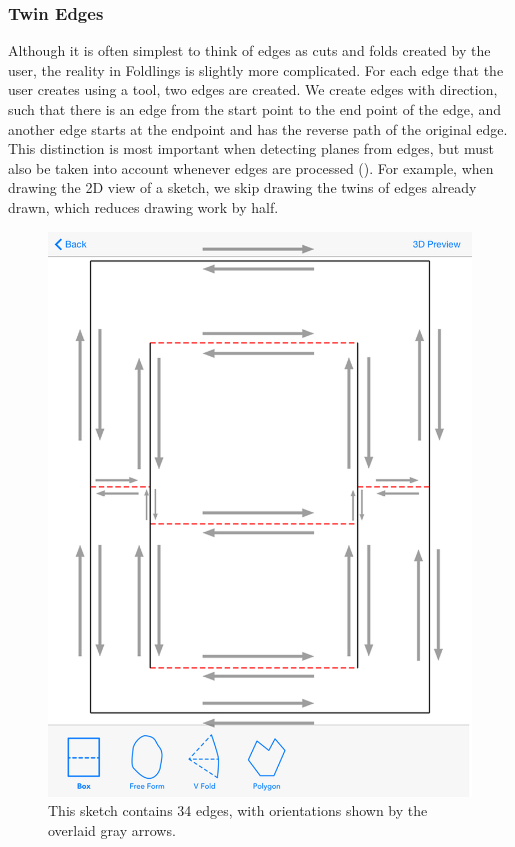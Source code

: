 \subsubsection{Twin Edges}\label{twin-edges}

Although it is often simplest to think of edges as cuts and folds
created by the user, the reality in Foldlings is slightly more
complicated. For each edge that the user creates using a tool, two edges
are created. We create edges with direction, such that there is an edge
from the start point to the end point of the edge, and another edge
starts at the endpoint and has the reverse path of the original edge.
This distinction is most important when detecting planes from edges, but
must also be taken into account whenever edges are processed
(\citet{mallen}). For example, when drawing the 2D view of a sketch, we
skip drawing the twins of edges already drawn, which reduces drawing
work by half.

\begin{figure}[htbp]
\centering
\includegraphics{figures/33_UI_Interface_Data_Structures/boxfold_34_edges.png}
\caption{This sketch contains 34 edges, with orientations shown by the
overlaid gray arrows.}
\end{figure}

